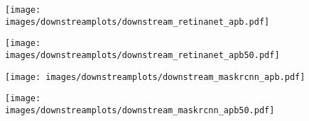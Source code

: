\documentclass[final]{cvpr}
\begin{document}
\begin{table*}[!ht]
\centering
{}
\caption{Top-1 accuracy when pre-trained on ImageNet-1k and fine-tuned on CIFAR-10, CIFAR100 and Flowers-102. It reaches best performance on Flowers-102 among different model sizes.}
\label{tab:tarnsfer}
\end{table*} \begin{figure*}[htpb!]
     \centering
     \begin{subfigure}[b]{0.245\textwidth}
         \centering
         \texttt{[image: images/downstreamplots/downstream\_retinanet\_apb.pdf]}
     \end{subfigure}
     \hfill
     \begin{subfigure}[b]{0.245\textwidth}
         \centering
         \texttt{[image: images/downstreamplots/downstream\_retinanet\_apb50.pdf]}
     \end{subfigure}
     \hfill
     \begin{subfigure}[b]{0.245\textwidth}
         \centering
         \texttt{[image: images/downstreamplots/downstream\_maskrcnn\_apb.pdf]}
     \end{subfigure}
     \hfill
     \begin{subfigure}[b]{0.245\textwidth}
         \centering
         \texttt{[image: images/downstreamplots/downstream\_maskrcnn\_apb50.pdf]}
     \end{subfigure}\\
     \begin{subfigure}[b]{0.245\textwidth}

\end{subfigure}
\end{figure*}
\end{document}
